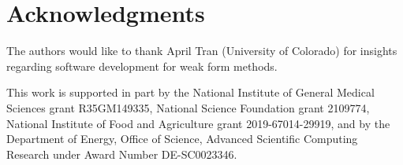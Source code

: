 \section{Acknowledgments} \label{sec:ack}

The authors would like to thank  April Tran (University of Colorado) for insights regarding software development for weak form methods.

This work is supported in part by the National Institute of General Medical Sciences grant R35GM149335, National Science Foundation grant 
2109774, National Institute of Food and Agriculture grant 2019-67014-29919, and by the Department of Energy, Office of Science, Advanced Scientific Computing Research under Award Number DE-SC0023346.